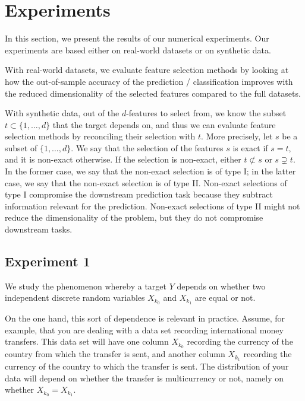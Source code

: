 \section{Experiments}
In this section,
we present the results of our numerical experiments.
Our experiments are based
either 
on real-world datasets
or on synthetic data.

With real-world datasets,
we evaluate
feature selection methods
by looking at 
how
the out-of-sample accuracy of the prediction / classification
improves with the reduced dimensionality of the selected features
compared to the full datasets.

With synthetic data, 
out 
of the $d$-features to select from,
we know the subset 
$t \subset \lbrace 1, \dots, d\rbrace$
that the target depends on,
and thus
we can evaluate feature selection methods
by reconciling their selection with $t$.
More precisely,
let 
$s$ 
be a subset of 
$\lbrace1, \dots, d\rbrace$.
We say that 
the selection of the features 
$s$ is exact if $s=t$,
and it is non-exact otherwise. 
If the selection is non-exact,
either 
$t \not \subset s$
or
$s \supsetneq t$.
In the former case, 
we say that the non-exact selection is of type I;
in the latter case,
we say that the non-exact selection is of type II. 
Non-exact selections of type I 
compromise the downstream prediction task 
because 
they subtract information relevant for the prediction.
Non-exact selections of type II
might not reduce the dimensionality of the problem,
but they do not compromise downstream tasks. 


\subsection{Experiment 1}
We study the phenomenon
whereby
a target $Y$ depends
on whether
two independent discrete random variables 
$X_{k_0}$ 
and
$X_{k_1}$
are equal or not.

On the one hand, 
this sort of dependence is relevant in practice.
Assume, 
for example,
that 
you are dealing with a data set recording 
international money transfers.
This data set will have 
one column $X_{k_0}$ recording 
the currency of the country from which the transfer is sent,
and another column $X_{k_1}$ recording
the currency of the country to which the transfer is sent.
The distribution of your data will
depend on whether the transfer is multicurrency or not, 
namely on whether $X_{k_0} = X_{k_1}$.

